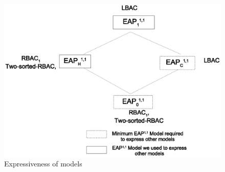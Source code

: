  \begin{figure}
 	\centering
 	\includegraphics[width=.8\textwidth]{ABAC16/expressiveness-spectrum}
 	\caption{Expressiveness of \eapABAC{} models}
 	\label{fig:expressiveness-spectrum}
 \end{figure}